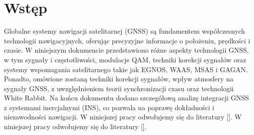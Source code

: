 
\section{Wstęp}

Globalne systemy nawigacji satelitarnej (GNSS) są fundamentem współczesnych technologii nawigacyjnych, oferując precyzyjne informacje o położeniu, prędkości i czasie. W niniejszym dokumencie przedstawi\-ono różne aspekty technologii GNSS, w tym sygnały i częstotliwości, modulacje QAM, techniki korekcji sygnałów oraz systemy wspomagania satelitarnego takie jak EGNOS, WAAS, MSAS i GAGAN. Ponadto, omówione zostaną techniki korekcji sygnałów, wpływ atmosfery na sygnały GNSS, z uwzględnieniem teorii synchronizacji czasu oraz technologii White Rabbit. Na końcu dokumentu dodano szczegółową analizę integracji GNSS z systemami inercjalnymi (INS), co pozwala na poprawę dokładności i niezawodności nawigacji.
W niniejszej pracy odwołujemy się do literatury [\cite{examplebook}].
W niniejszej pracy odwołujemy się do literatury [\cite{example2}].
